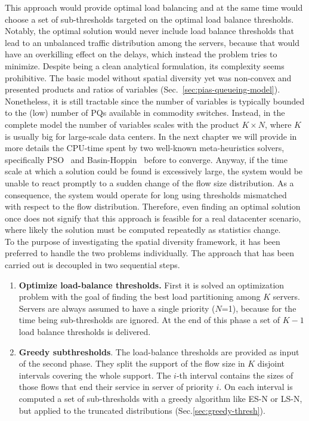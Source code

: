 This approach would provide optimal load balancing and at the same time would choose a set of sub-thresholds targeted on the optimal load balance thresholds. Notably, the optimal solution would never include load balance thresholds that lead to an unbalanced traffic distribution among the servers, because that would have an overkilling effect on the delays, which instead the problem tries to minimize. Despite being a clean analytical formulation, its complexity seems prohibitive. The basic model without spatial diversity yet was non-convex and presented products and ratios of variables (Sec.~\ref{sec:pias-queueing-model}). Nonetheless, it is still tractable since the number of variables is typically bounded to the (low) number of PQs available in commodity switches. Instead, in the complete model the number of variables scales with the product $K \times N$, where $K$ is usually big for large-scale data centers. In the next chapter we will provide in more details the CPU-time spent by two well-known meta-heuristics solvers, specifically PSO~\cite{pso,pso2} and Basin-Hoppin~\cite{basinhoppin} before to converge. Anyway, if the time scale at which a solution could be found is excessively large, the system would be unable to react promptly to a sudden change of the flow size distribution. As a consequence, the system would operate for long using thresholds mismatched with respect to the flow distribution. Therefore, even finding an optimal solution once does not signify that this approach is feasible for a real datacenter scenario, where likely the solution must be computed repeatedly as statistics change. \\
To the purpose of investigating the spatial diversity framework, it has been preferred to handle the two problems individually. The approach that has been carried out is decoupled in two sequential steps.
\begin{enumerate}
	\item \textbf{Optimize load-balance thresholds.} First it is solved an optimization problem with the goal of finding the best load partitioning among $K$ servers. Servers are always assumed to have a single priority ($N$=1), because for the time being sub-thresholds are ignored. At the end of this phase a set of $K-1$ load balance thresholds is delivered.
	\item \textbf{Greedy subthresholds}. The load-balance thresholds are provided as input of the second phase. They split the support of the flow size in $K$ disjoint intervals covering the whole support. The $i$-th interval contains the sizes of those flows that end their service in server of priority $i$. On each interval is computed a set of sub-thresholds with a greedy algorithm like ES-N or LS-N, but applied to the truncated distributions (Sec.\ref{sec:greedy-thresh}).  
\end{enumerate}

